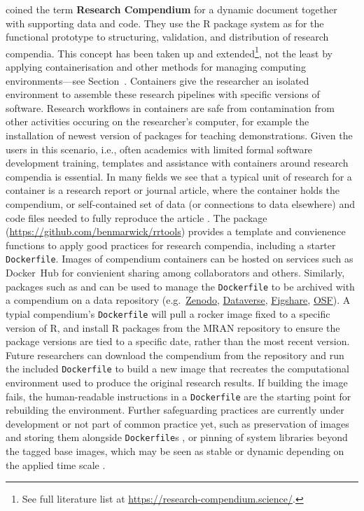 \citet{gentleman_statistical_2007} coined the term \textbf{Research
Compendium} for a dynamic document together with supporting data and
code. They use the R package system \cite{core_writing_1999} as for the
functional prototype to structuring, validation, and distribution of
research compendia. This concept has been taken up and
extended\footnote{See full literature list at \href{https://research-compendium.science/}{https://research-compendium.science/}.},
not the least by applying containerisation and other methods for
managing computing environments---see Section~. Containers
give the researcher an isolated environment to assemble these research
pipelines with specific versions of software. Research workflows in
containers are safe from contamination from other activities occuring on
the researcher's computer, for example the installation of newest
version of packages for teaching demonstrations. Given the users in this
scenario, i.e., often academics with limited formal software development
training, templates and assistance with containers around research
compendia is essential. In many fields we see that a typical unit of
research for a container is a research report or journal article, where
the container holds the compendium, or self-contained set of data (or
connections to data elsewhere) and code files needed to fully reproduce
the article \citep{marwick_packaging_2018}. The package 
(\url{https://github.com/benmarwick/rrtools}) provides a template and
convienence functions to apply good practices for research compendia,
including a starter \texttt{Dockerfile}. Images of compendium containers
can be hosted on services such as Docker~Hub for convienient sharing
among collaborators and others. Similarly, packages such as
 and  can be used to manage the
\texttt{Dockerfile} to be archived with a compendium on a data
repository (e.g.~\href{https://zenodo.org/}{Zenodo},
\href{https://dataverse.org/}{Dataverse},
\href{https://figshare.com/}{Figshare}, \href{https://osf.io/}{OSF}). A
typial compendium's \texttt{Dockerfile} will pull a rocker image fixed
to a specific version of R, and install R packages from the MRAN
repository to ensure the package versions are tied to a specific date,
rather than the most recent version. Future researchers can download the
compendium from the repository and run the included \texttt{Dockerfile}
to build a new image that recreates the computational environment used
to produce the original research results. If building the image fails,
the human-readable instructions in a \texttt{Dockerfile} are the
starting point for rebuilding the environment. Further safeguarding
practices are currently under development or not part of common practice
yet, such as preservation of images \citep{emsley_framework_2018} and
storing them alongside \texttt{Dockerfile}s
\citep[cf.][]{nust_opening_2017}, or pinning of system libraries beyond
the tagged base images, which may be seen as stable or dynamic depending
on the applied time scale
\citep[see discussion on `debian:testing` base image in][]{RJ-2017-065}.

